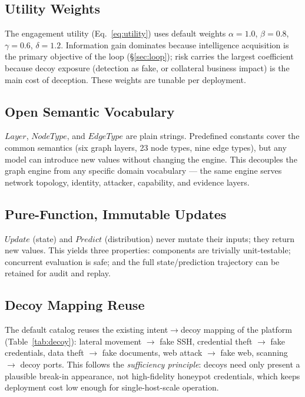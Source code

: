 \documentclass[11pt]{article}
\begin{document}
\subsection{Utility Weights}

The engagement utility (Eq.~\ref{eq:utility}) uses default weights
$\alpha=1.0$, $\beta=0.8$, $\gamma=0.6$, $\delta=1.2$. Information gain
dominates because intelligence acquisition is the primary objective of the
loop (\S\ref{sec:loop}); risk carries the largest coefficient because decoy
exposure (detection as fake, or collateral business impact) is the main cost
of deception. These weights are tunable per deployment.

\subsection{Open Semantic Vocabulary}
\label{sec:open-vocab}

$\mathit{Layer}$, $\mathit{NodeType}$, and $\mathit{EdgeType}$ are plain
strings. Predefined constants cover the common semantics (six graph layers,
23 node types, nine edge types), but any model can introduce new values
without changing the engine. This decouples the graph engine from any
specific domain vocabulary --- the same engine serves network topology,
identity, attacker, capability, and evidence layers.

\subsection{Pure-Function, Immutable Updates}

$\mathit{Update}$ (state) and $\mathit{Predict}$ (distribution) never mutate
their inputs; they return new values. This yields three properties:
components are trivially unit-testable; concurrent evaluation is safe; and
the full state/prediction trajectory can be retained for audit and replay.

\subsection{Decoy Mapping Reuse}

The default catalog reuses the existing intent$\to$decoy mapping of the
platform (Table~\ref{tab:decoy}): lateral movement $\to$ fake SSH,
credential theft $\to$ fake credentials, data theft $\to$ fake documents,
web attack $\to$ fake web, scanning $\to$ decoy ports. This follows the
\textit{sufficiency principle}: decoys need only present a plausible
break-in appearance, not high-fidelity honeypot credentials, which keeps
deployment cost low enough for single-host-scale operation.
\end{document}
